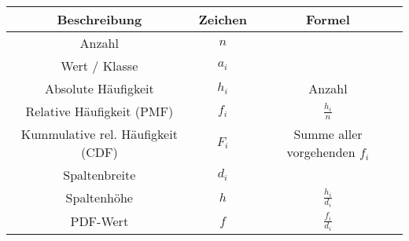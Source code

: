 \documentclass{article}
\begin{document}
\begin{tabular}{|c c c|} 
 \hline
 Beschreibung & Zeichen & Formel\\
 \hline
	
		Anzahl &
		$ n $ &
		\\ 
 	\hline
	
	
		Wert / Klasse &
		$ a_i $  &
		\\
 	\hline
 
 		Absolute H\"aufigkeit &
 		$ h_i $ &
 		Anzahl
 		\\
 	\hline

		Relative Häufigkeit (PMF) &
		$ f_i $ &
		$ \frac{h_i}{n} $ 
		\\
	\hline
	
 		Kummulative rel. H\"aufigkeit (CDF) & 
 		$F_i$ &
 		Summe aller vorgehenden $f_i$
 		\\
	\hline
	
		Spaltenbreite &
		$ d_i $ & 
		\\
	\hline
	
		Spaltenhöhe &
		$ h $ &
		$ \frac{h_i}{d_i} $
		\\
	\hline
	
		PDF-Wert &
		$f$ &
		$ \frac{f_i}{d_i} $
		\\
	\hline
	
\end{tabular}

	
\end{document}
